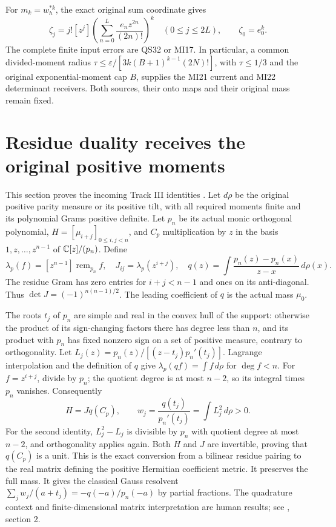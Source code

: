\documentclass[11pt]{article}
\begin{document}
For \(m_k=w_h^{*k}\), the exact original sum coordinate gives
\begin{equation}\tag{NI11}
 \zeta_j=j![z^j]\left(\sum_{n=0}^L\frac{e_nz^{2n}}{(2n)!}\right)^k
 \quad(0\le j\le2L),\qquad \zeta_0=e_0^k.
\end{equation}
The complete finite input errors are QS32 or MI17. In particular,
a common divided-moment radius
\(\tau\le\varepsilon/[3k(B+1)^{k-1}(2N)!]\), with
\(\tau\le1/3\) and the original exponential-moment cap \(B\),
supplies the MI21 current and MI22 determinant receivers.
Both sources, their onto maps and their original mass remain fixed.

\section{Residue duality receives the original positive moments}
This section proves the incoming Track III identities \cite{Intake}.
Let \(d\rho\) be the original positive parity measure or its positive
tilt, with all required moments finite and its polynomial Grams
positive definite. Let \(p_n\) be its actual monic orthogonal polynomial,
\(H=[\mu_{i+j}]_{0\le i,j<n}\), and \(C_p\) multiplication by \(z\)
in the basis \(1,z,\ldots,z^{n-1}\) of \(\mathbb C[z]/(p_n)\).
Define
\[
 \lambda_p(f)=[z^{n-1}]\operatorname{rem}_{p_n}f,\quad
 J_{ij}=\lambda_p(z^{i+j}),\quad
 q(z)=\int\frac{p_n(z)-p_n(x)}{z-x}\,d\rho(x).
\]
The residue Gram has zero entries for \(i+j<n-1\) and ones on
its anti-diagonal. Thus \(\det J=(-1)^{n(n-1)/2}\).
The leading coefficient of \(q\) is the actual mass \(\mu_0\).

The roots \(t_j\) of \(p_n\) are simple and real in the convex hull
of the support: otherwise the product of its sign-changing factors
there has degree less than \(n\), and its product with \(p_n\)
has fixed nonzero sign on a set of positive measure, contrary to
orthogonality. Let
\(L_j(z)=p_n(z)/[(z-t_j)p_n'(t_j)]\).
Lagrange interpolation and the definition of \(q\) give
\(\lambda_p(qf)=\int f\,d\rho\) for \(\deg f<n\).
For \(f=z^{i+j}\), divide by \(p_n\); the quotient degree is at
most \(n-2\), so its integral times \(p_n\) vanishes. Consequently
\begin{equation}\tag{NI12}
 H=Jq(C_p),\qquad
 w_j=\frac{q(t_j)}{p_n'(t_j)}
     =\int L_j^2\,d\rho>0.
\end{equation}
For the second identity, \(L_j^2-L_j\) is divisible by \(p_n\)
with quotient degree at most \(n-2\), and orthogonality applies again.
Both \(H\) and \(J\) are invertible, proving that \(q(C_p)\) is a unit.
This is the exact conversion from a bilinear residue pairing to
the real matrix defining the positive Hermitian coefficient metric.
It preserves the full mass. It gives the classical Gauss resolvent
\(\sum_jw_j/(a+t_j)=-q(-a)/p_n(-a)\) by partial fractions.
The quadrature context and finite-dimensional matrix interpretation
are human results; see \cite{ZDS}, section 2.
\end{document}
